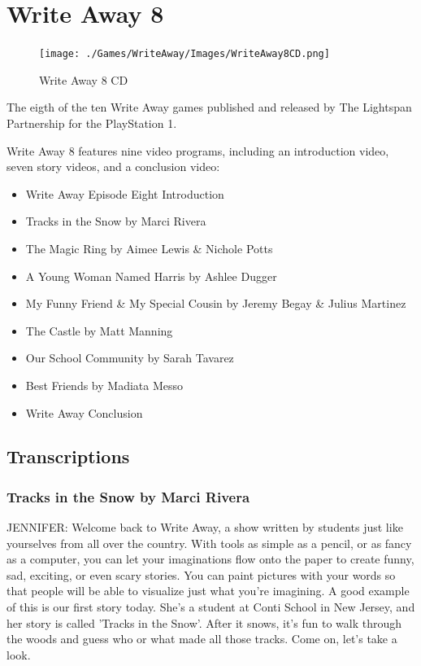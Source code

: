 \chapter{Write Away 8}

\begin{figure}[H]
    \centering
    \texttt{[image: ./Games/WriteAway/Images/WriteAway8CD.png]}
    \caption{Write Away 8 CD}
\end{figure}

The eigth of the ten Write Away games published and released by The Lightspan Partnership for the PlayStation 1.

Write Away 8 features nine video programs, including an introduction video, seven story videos, and a conclusion video:

\begin{itemize}
    \item Write Away Episode Eight Introduction
    \item Tracks in the Snow by Marci Rivera
    \item The Magic Ring by Aimee Lewis \& Nichole Potts
    \item A Young Woman Named Harris by Ashlee Dugger
    \item My Funny Friend \& My Special Cousin by Jeremy Begay \& Julius Martinez
    \item The Castle by Matt Manning
    \item Our School Community by Sarah Tavarez
    \item Best Friends by Madiata Messo
    \item Write Away Conclusion
\end{itemize}

\clearpage
\newpage

\section{Transcriptions}

\subsection{Tracks in the Snow by Marci Rivera}

JENNIFER:
Welcome back to Write Away, a show written by students just like yourselves from all over the country.
With tools as simple as a pencil, or as fancy as a computer, you can let your imaginations flow onto the paper to create funny, sad, exciting, or even scary stories.
You can paint pictures with your words so that people will be able to visualize just what you're imagining.
A good example of this is our first story today.
She's a student at Conti School in New Jersey, and her story is called 'Tracks in the Snow'.
After it snows, it's fun to walk through the woods and guess who or what made all those tracks.
Come on, let's take a look.

